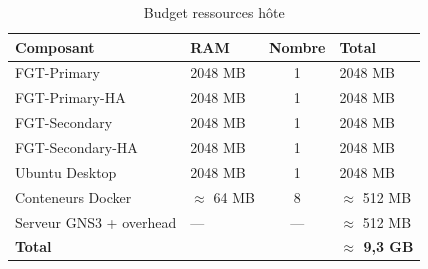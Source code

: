 \begin{table}[H]
\centering
\caption{Budget ressources hôte}
\label{tab:resource-budget}
\begin{tabularx}{\textwidth}{|l|l|c|X|}
\hline
\textbf{Composant} & \textbf{RAM} & \textbf{Nombre} & \textbf{Total} \\
\hline
FGT-Primary & 2048 MB & 1 & 2048 MB \\
FGT-Primary-HA & 2048 MB & 1 & 2048 MB \\
FGT-Secondary & 2048 MB & 1 & 2048 MB \\
FGT-Secondary-HA & 2048 MB & 1 & 2048 MB \\
Ubuntu Desktop & 2048 MB & 1 & 2048 MB \\
Conteneurs Docker & $\approx$ 64 MB & 8 & $\approx$ 512 MB \\
Serveur GNS3 + overhead & --- & --- & $\approx$ 512 MB \\
\hline
\textbf{Total} & & & \textbf{$\approx$ 9,3 GB} \\
\hline
\end{tabularx}
\end{table}
